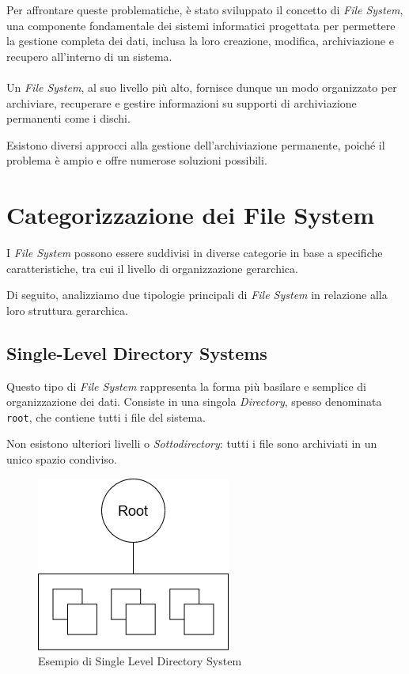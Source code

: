 \documentclass[12pt,a4paper,openright,twoside]{book}
\begin{document}
        Per affrontare queste problematiche, è stato sviluppato il concetto di \textit{File System}, una componente fondamentale dei sistemi informatici progettata per permettere la gestione completa dei dati, inclusa la loro creazione, modifica, archiviazione e recupero all'interno di un sistema.

        \paragraph*{}

        Un \textit{File System}, al suo livello più alto, fornisce dunque un modo organizzato per archiviare, recuperare e gestire informazioni su supporti di archiviazione permanenti come i dischi.

        Esistono diversi approcci alla gestione dell'archiviazione permanente, poiché il problema è ampio e offre numerose soluzioni possibili.

        \cite{giampaolo1998practical}\cite{tanenbaum2015modern}

    \section{Categorizzazione dei File System}

        I \textit{File System} possono essere suddivisi in diverse categorie in base a specifiche caratteristiche, tra cui il livello di organizzazione gerarchica.

        Di seguito, analizziamo due tipologie principali di \textit{File System} in relazione alla loro struttura gerarchica.


        \subsection{Single-Level Directory Systems}

            Questo tipo di \textit{File System} rappresenta la forma più basilare e semplice di organizzazione dei dati. Consiste in una singola \textit{Directory}, spesso denominata \texttt{root}, che contiene tutti i file del sistema.

            Non esistono ulteriori livelli o \textit{Sottodirectory}: tutti i file sono archiviati in un unico spazio condiviso.

            \begin{figure}
                \centering
                \includegraphics[width=.4\linewidth]{figures/SingleDirSystem.png}
                \caption{Esempio di Single Level Directory System}
                \label{fig:single-level-directory}
            \end{figure}
\end{document}
